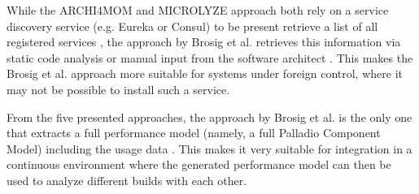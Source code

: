 While the ARCHI4MOM and MICROLYZE approach both rely on a service discovery service (e.g. Eureka or Consul) to be present retrieve a list of all registered services \cite{Singh2022ARCHI4MOM,Kleehaus2018}, the approach by Brosig et al. retrieves this information via static code analysis or manual input from the software architect \cite{Brosig2011}.
This makes the Brosig et al. approach more suitable for systems under foreign control, where it may not be possible to install such a service.

From the five presented approaches, the approach by Brosig et al. is the only one that extracts a full performance model (namely, a full Palladio Component Model) including the usage data \cite{Brosig2011}.
This makes it very suitable for integration in a continuous environment where the generated performance model can then be used to analyze different builds with each other.




